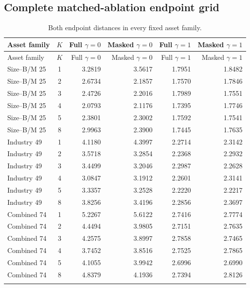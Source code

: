 \subsection{Complete matched-ablation endpoint grid}
\small
\begin{longtable}{@{}lcrrrr@{}}
\caption{Both endpoint distances in every fixed asset family.}\label{tab:s-matched-grid}\\
\toprule
Asset family & $K$ & Full $\gamma=0$ & Masked $\gamma=0$ & Full $\gamma=1$ & Masked $\gamma=1$ \\
\midrule\endfirsthead
\toprule
Asset family & $K$ & Full $\gamma=0$ & Masked $\gamma=0$ & Full $\gamma=1$ & Masked $\gamma=1$ \\
\midrule\endhead
Size--B/M 25 & 1 & 3.2819 & 3.5617 & 1.7951 & 1.8482 \\
Size--B/M 25 & 2 & 2.6734 & 2.1857 & 1.7570 & 1.7846 \\
Size--B/M 25 & 3 & 2.4726 & 2.2016 & 1.7989 & 1.7551 \\
Size--B/M 25 & 4 & 2.0793 & 2.1176 & 1.7395 & 1.7746 \\
Size--B/M 25 & 5 & 2.3801 & 2.3002 & 1.7592 & 1.7541 \\
Size--B/M 25 & 8 & 2.9963 & 2.3900 & 1.7445 & 1.7635 \\
\addlinespace
Industry 49 & 1 & 4.1180 & 4.3997 & 2.2714 & 2.3142 \\
Industry 49 & 2 & 3.5718 & 3.2854 & 2.2368 & 2.2932 \\
Industry 49 & 3 & 3.4499 & 3.2046 & 2.2987 & 2.2628 \\
Industry 49 & 4 & 3.0847 & 3.1912 & 2.2601 & 2.3141 \\
Industry 49 & 5 & 3.3357 & 3.2528 & 2.2220 & 2.2217 \\
Industry 49 & 8 & 3.8256 & 3.4196 & 2.2856 & 2.3697 \\
\addlinespace
Combined 74 & 1 & 5.2267 & 5.6122 & 2.7416 & 2.7774 \\
Combined 74 & 2 & 4.4494 & 3.9805 & 2.7151 & 2.7635 \\
Combined 74 & 3 & 4.2575 & 3.8997 & 2.7858 & 2.7465 \\
Combined 74 & 4 & 3.7452 & 3.8516 & 2.7525 & 2.7865 \\
Combined 74 & 5 & 4.1055 & 3.9942 & 2.6996 & 2.6990 \\
Combined 74 & 8 & 4.8379 & 4.1936 & 2.7394 & 2.8126 \\
\addlinespace
\bottomrule\end{longtable}
\normalsize
